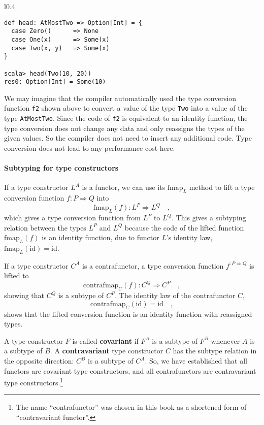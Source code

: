 \begin{wrapfigure}{l}{0.4\columnwidth}%
\vspace{-0.5\baselineskip}
\begin{lstlisting}
def head: AtMostTwo => Option[Int] = {
  case Zero()      => None
  case One(x)      => Some(x)
  case Two(x, y)   => Some(x)
}

scala> head(Two(10, 20))
res0: Option[Int] = Some(10)
\end{lstlisting}

\vspace{-1\baselineskip}
\end{wrapfigure}%
We may imagine that the compiler automatically used the type conversion
function \lstinline!f2! shown above to convert a value of the type
\lstinline!Two! into a value of the type \lstinline!AtMostTwo!.
Since the code of \lstinline!f2! is equivalent to an identity function,
the type conversion does not change any data and only reassigns the
types of the given values. So the compiler does not need to insert
any additional code. Type conversion does not lead to any performance
cost here.

\paragraph{Subtyping for type constructors}

If a type constructor $L^{A}$ is a functor, we can use its $\text{fmap}_{L}$
method to lift a type conversion function $f:P\Rightarrow Q$ into
\[
\text{fmap}_{L}(f):L^{P}\Rightarrow L^{Q}\quad,
\]
which gives a type conversion function from $L^{P}$ to $L^{Q}$.
This gives a subtyping relation between the types $L^{P}$ and $L^{Q}$
because the code of the lifted function $\text{fmap}_{L}(f)$ is an
identity function, due to functor $L$'s identity law, $\text{fmap}_{L}(\text{id})=\text{id}$. 

If a type constructor $C^{A}$ is a contrafunctor, a type conversion
function $f^{:P\Rightarrow Q}$ is lifted to 
\[
\text{contrafmap}_{C}(f):C^{Q}\Rightarrow C^{P}\quad,
\]
showing that $C^{Q}$ is a subtype of $C^{P}$. The identity law of
the contrafunctor $C$, 
\[
\text{contrafmap}_{C}(\text{id})=\text{id}\quad,
\]
shows that the lifted conversion function is an identity function
with reassigned types.

A type constructor $F$ is called \textbf{covariant}
if $F^{A}$ is a subtype of $F^{B}$ whenever $A$ is a subtype of
$B$. A \textbf{contravariant}
type constructor $C$ has the subtype relation in the opposite direction:
$C^{B}$ is a subtype of $C^{A}$. So, we have established that all
functors are covariant type constructors, and all contrafunctors are
contravariant type constructors.\footnote{The name ``contrafunctor'' was chosen in this book as a shortened
form of ``contravariant functor''.} 

